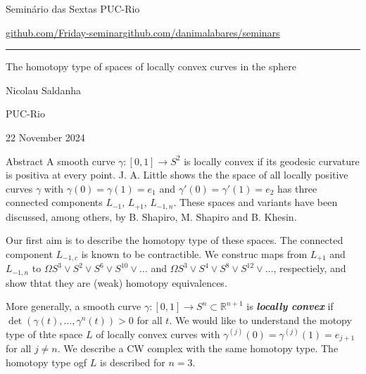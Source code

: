 


\begin{minipage}{\textwidth}
	\begin{minipage}{1\textwidth}
		Semin\'ario das Sextas \hfill PUC-Rio
		
		{\small\href{https://github.com/Friday-seminar/}{github.com/Friday-seminar}\hfill\href{https://github.com/danimalabares/seminars}{github.com/danimalabares/seminars}}
		\end{minipage}
\end{minipage}\vspace{.2cm}\hrule

\vspace{10pt}

{\Huge The homotopy type of spaces of locally convex curves in the sphere}

\hfill{\Large Nicolau Saldanha}

\hfill{\Large PUC-Rio}

\hfill{\large 22 November 2024}

\begin{thing4}{Abstract}
	A smooth curve $\gamma:[0,1]\to S^2$ is locally convex if its geodesic curvature is positiva at every point. J. A. Little shows the the space of all locally positive curves $\gamma$ with $\gamma(0)=\gamma(1)=e_1$ and $\gamma'(0)=\gamma'(1)=e_2$ has three connected components $L_{-1}$, $L_{+1}$, $L_{-1,n}$. These spaces and variants have been discussed, among others, by B. Shapiro, M. Shapiro and B. Khesin.

	Our first aim is to describe the homotopy type of these spaces. The connected component $L_{-1,c}$ is known to be contractible. We construc maps from $L_{+1}$ and $L_{-1,n}$ to $\Omega S^3 \vee S^2 \vee S^6 \vee S^{10}\vee \ldots$ and $\Omega S^3\vee S^4 \vee S^8 \vee S^{12} \vee \ldots$, respectiely, and show thtat they are (weak) homotopy equivalences.

	More generally, a smooth curve $\gamma:[0,1]\to S^n \subset \mathbb{R}^{n+1}$ is \textit{\textbf{locally convex}} if $\det(\gamma(t),\ldots,\gamma^n(t))>0$ for all $t$. We would like to understand the motopy type of thte space $L$ of locally convex curves with $\gamma^{(j)}(0)=\gamma^{(j)}(1)=e_{j+1}$ for all $j \neq n$. We describe a CW complex with the same homotopy type. The homotopy type ogf $L$ is described for $n=3$.
\end{thing4}

